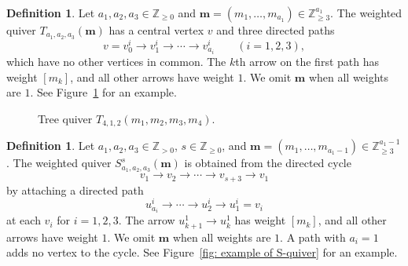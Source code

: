 \documentclass[11pt,reqno]{amsart}
\numberwithin{equation}{section}
\theoremstyle{definition}
\newtheorem{definition}[example]{Definition}
\theoremstyle{plain}
\newcommand{\bra}[1]{\left[#1\right]}
\begin{document}
	\begin{definition}
		Let $a_1,a_2,a_3\in\mathbb Z_{\ge0}$ and $\mathbf m=(m_1,\ldots,m_{a_1})\in\mathbb Z_{\ge3}^{a_1}$. The weighted quiver $T_{a_1,a_2,a_3}(\mathbf m)$ has a central vertex $v$ and three directed paths
		\[
		v=v_0^i\longrightarrow v_1^i\longrightarrow\cdots
		\longrightarrow v_{a_i}^i
		\qquad(i=1,2,3),
		\]
		which have no other vertices in common. The $k$th arrow on the first path has weight $\bra{m_k}$, and all other arrows have weight $1$. We omit $\mathbf m$ when all weights are $1$. See Figure~\ref{fig: tree quiver} for an example.
	\end{definition}
	
	\begin{figure}[htbp]
		\centering
		\caption{Tree quiver $T_{4,1,2}(m_1,m_2,m_3,m_4)$.}
		\label{fig: tree quiver}
	\end{figure}
	
	\begin{definition}\label{def:quiverS}
		Let $a_1,a_2,a_3\in\mathbb Z_{>0}$, $s\in\mathbb Z_{\ge0}$, and $\mathbf m=(m_1,\ldots,m_{a_1-1}) \in\mathbb Z_{\ge3}^{a_1-1}$. The weighted quiver $S_{a_1,a_2,a_3}^{s}(\mathbf m)$ is obtained from the directed cycle
		\[
		v_1\longrightarrow v_2\longrightarrow\cdots
		\longrightarrow v_{s+3}\longrightarrow v_1
		\]
		by attaching a directed path
		\[
		u_{a_i}^i\longrightarrow\cdots\longrightarrow u_2^i
		\longrightarrow u_1^i=v_i
		\]
		at each $v_i$ for $i=1,2,3$. The arrow $u_{k+1}^1\to u_k^1$ has weight $\bra{m_k}$, and all other arrows have weight $1$. We omit $\mathbf m$ when all weights are $1$. A path with $a_i=1$ adds no vertex to the cycle. See Figure~\ref{fig: example of S-quiver} for an example.
	\end{definition}
	
\end{document}
